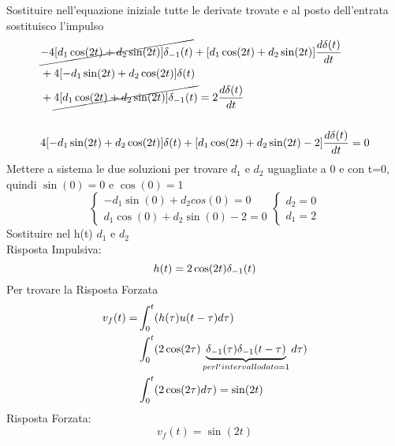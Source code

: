 		Sostituire nell'equazione iniziale tutte le derivate trovate e al posto dell'entrata sostituisco l'impulso
		\[
		\begin{split}
		&\cancel{-4[d_1\cos(2t)+d_2\sin(2t)]\delta_{-1}(t)}
		+[d_1\cos(2t)+d_2\sin(2t)]\frac{d\delta(t)}{dt}\\
		&+4[-d_1\sin(2t)+d_2\cos(2t)]\delta(t)\\&+\cancel{4[d_1\cos(2t) + d_2\sin(2t)] \delta_{-1}(t)}  = 2\frac{d\delta(t)}{dt}\\
		\\
		&4[-d_1\sin(2t)+d_2\cos(2t)]\delta(t) + [d_1\cos(2t)+d_2\sin(2t)-2]\frac{d\delta(t)}{dt} = 0
		\end{split}
		\]
		Mettere a sistema le due soluzioni per trovare $d_1$ e $d_2$ uguagliate a 0 e con t=0, quindi $\sin(0)=0$ e $\cos(0)=1$
		\[
		\begin{cases}
		-d_1\sin(0)+d_2cos(0) = 0\\
		d_1\cos(0)+d_2\sin(0)-2 = 0
 		\end{cases}
		\begin{cases}
		d_2 = 0\\
		d_1 = 2
		\end{cases}
		\]
		Sostituire nel h(t) $d_1$ e $d_2$\\
		Risposta Impulsiva:
		\[
		h(t)=2\cos(2t)\delta_{-1}(t)
		\]
		Per trovare la Risposta Forzata\\
		\[
		\begin{split}
		v_f(t)=&\int_{0}^{t}(h(\tau)u(t-\tau)d\tau)\\
		&\int_{0}^{t}(2\cos(2\tau)\underbrace{\delta_{-1}(\tau)\delta_{-1}(t-\tau)}_{per l'intervallo dato = 1}d\tau)\\
		&\int_{0}^{t}(2\cos(2\tau)d\tau) = \sin(2t)\\
		\end{split}
		\]
		Risposta Forzata:
		\[
		v_f(t) = \sin(2t)
		\]
	\newpage
